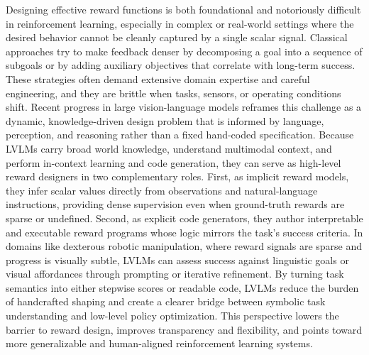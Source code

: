 \documentclass[master,english,final]{kaist-ucs}
\begin{document}
Designing effective reward functions is both foundational and notoriously difficult in reinforcement learning, especially in complex or real-world settings where the desired behavior cannot be cleanly captured by a single scalar signal\cite{eschmann2021reward}. Classical approaches try to make feedback denser by decomposing a goal into a sequence of subgoals or by adding auxiliary objectives that correlate with long-term success\cite{andreas2017modular, mirchandani2021ella}. These strategies often demand extensive domain expertise and careful engineering, and they are brittle when tasks, sensors, or operating conditions shift\cite{booth2023perils}. Recent progress in large vision-language models reframes this challenge as a dynamic, knowledge-driven design problem that is informed by language, perception, and reasoning rather than a fixed hand-coded specification. Because LVLMs carry broad world knowledge, understand multimodal context, and perform in-context learning and code generation, they can serve as high-level reward designers in two complementary roles. First, as implicit reward models, they infer scalar values directly from observations and natural-language instructions, providing dense supervision even when ground-truth rewards are sparse or undefined. Second, as explicit code generators, they author interpretable and executable reward programs whose logic mirrors the task’s success criteria. In domains like dexterous robotic manipulation, where reward signals are sparse and progress is visually subtle, LVLMs can assess success against linguistic goals or visual affordances through prompting or iterative refinement\cite{ma2023eureka}. By turning task semantics into either stepwise scores or readable code, LVLMs reduce the burden of handcrafted shaping and create a clearer bridge between symbolic task understanding and low-level policy optimization. This perspective lowers the barrier to reward design, improves transparency and flexibility, and points toward more generalizable and human-aligned reinforcement learning systems.
\end{document}
